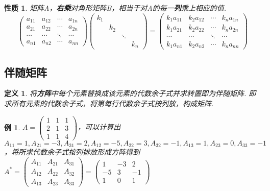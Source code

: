 \documentclass[12pt, a4paper, oneside]{ctexbook}
\newtheorem{definition}[theorem]{定义}
\newtheorem{example}[theorem]{例}
\newtheorem{quolity}[theorem]{性质}
\begin{document}
\begin{quolity}
    矩阵A，\textbf{右乘}对角形矩阵B，相当于对A的每一\textbf{列}乘上相应的值. 
    $$\left ( \begin{matrix}
        a_{11} & a_{12} & \cdots & a_{1n} \\
        a_{21} & a_{22} & \cdots & a_{2n} \\
        \cdots & \cdots & \ddots & \cdots \\
        a_{n1} & a_{n2} & \cdots & a_{nn}
    \end{matrix} \right ) \left ( \begin{matrix}
        k_1 &   &   & \\
          & k_2 &   & \\
          &   & \ddots & \\
          &   &   & k_n
    \end{matrix} \right ) = \left ( \begin{matrix}
        k_1a_{11} & k_2a_{12} & \cdots & k_na_{1n} \\
        k_1a_{21} & k_2a_{22} & \cdots & k_na_{2n} \\
        \cdots & \cdots & \ddots & \cdots \\
        k_1a_{n1} & k_2a_{n2} & \cdots & k_na_{nn}
    \end{matrix} \right )$$
\end{quolity}

\subsection{伴随矩阵}

\begin{definition}
    将\textbf{方阵}中每个元素替换成该元素的代数余子式并求转置即为伴随矩阵. 即求所有元素的代数余子式，将第每行代数余子式按列放，构成矩阵. 
\end{definition}

\begin{example}
    $A=\left ( \begin{matrix}
        1 & 1 & 1 \\
        2 & 1 & 3 \\
        1 & 1 & 4
    \end{matrix} \right )$，可以计算出$A_{11} = 1, A_{21} =-3, A_{31} = 2, A_{12} = -5, A_{22} = 3, A_{32} = -1, A_{13} = 1, A_{23} = 0, A_{33} = -1$，将所求代数余子式按列排放形成方阵得到$A^*= \left ( \begin{matrix}
        A_{11} & A_{21} & A_{31} \\
        A_{12} & A_{22} & A_{32} \\
        A_{13} & A_{23} & A_{33}
    \end{matrix} \right ) = \left ( \begin{matrix}
        1 & -3 & 2 \\
        -5 & 3 & -1 \\
        1 & 0 & 1
    \end{matrix} \right )$
\end{example}
\end{document}
